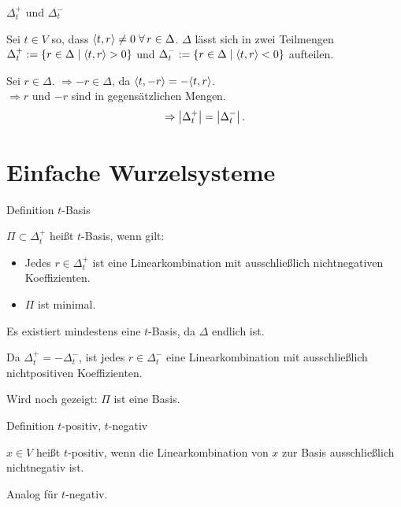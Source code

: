 \documentclass[18pt]{beamer}
\begin{document}
\begin{frame}{\( \Delta_t^+ \) und \( \Delta_t^- \)}
    \begin{defi}
        Sei \( t \in V \) so, dass \( \scalarprod{t}{r} \neq 0 
        \; \forall r \in \Delta \).\pause
        \( \Delta \) lässt sich in zwei Teilmengen 
        \( \Delta_t^+ := 
        \{r \in \Delta \;\vert \; \langle t, r \rangle > 0\} \) 
        und \( \Delta_t^- := 
        \{r \in \Delta \;\vert \; \langle t, r \rangle < 0\} \) 
        aufteilen. \pause
    \end{defi}
    

    Sei \( r \in \Delta \). \( \Rightarrow -r \in \Delta \), 
    da \( \langle t, -r \rangle = -\langle t, r \rangle \).\\
    \( \Rightarrow r \) und \( -r \) sind in 
    gegensätzlichen Mengen. \pause
    \[ \Rightarrow \left|\Delta_t^+\right| = \left|\Delta_t^-\right|. \]
\end{frame}

\section{Einfache Wurzelsysteme}
\begin{frame}{Definition \( t \)-Basis}
    \begin{defi}
        \( \Pi \subset \Delta_t^+ \) heißt \( t \)-Basis, 
        wenn gilt:
        \begin{itemize}
            \item Jedes \( r \in \Delta_t^+ \) ist 
            eine Linearkombination mit ausschließlich 
            nichtnegativen Koeffizienten.
            \item \( \Pi \) ist minimal.
        \end{itemize} \pause
        Es existiert mindestens eine \( t \)-Basis, 
        da \( \Delta \) endlich ist. \pause
    \end{defi}
    
    
    Da \( \Delta_t^+ = - \Delta_t^- \), ist jedes 
    \( r \in \Delta_t^- \) eine Linearkombination 
    mit ausschließlich nichtpositiven Koeffizienten.

    \pause
    Wird noch gezeigt: \( \Pi \) ist eine Basis.
\end{frame}

\begin{frame}{Definition \(t\)-positiv, \( t \)-negativ}
    \begin{defi}
        \( x \in V \) heißt \(t\)-positiv, wenn 
        die Linearkombination von \(x\) zur 
        Basis ausschließlich nichtnegativ ist.

        Analog für \( t \)-negativ.
    \end{defi}
\end{frame}
\end{document}
